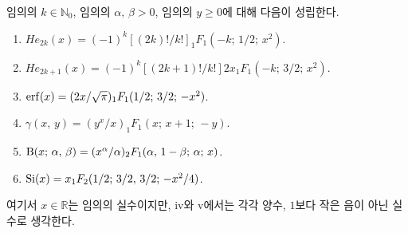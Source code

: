 \begin{theorem}
    임의의 $k\in\mathbb{N}_0$, 임의의 $\alpha,\,\beta>0$, 임의의 $y\geq0$에 대해 다음이 성립한다.
    \begin{enumerate}
        \item $He_{2k}(x)=(-1)^k[(2k)!/k!]_1F_1(-k;\,1/2;\,x^2)$.
        \item $He_{2k+1}(x)=(-1)^k[(2k+1)!/k!]2x_1F_1(-k;\,3/2;\,x^2)$.
        \item $\mathrm{erf}(x)=(2x/\sqrt{\pi})_1F_1(1/2;\,3/2;\,-x^2)$.
        \item $\gamma(x,\,y)=(y^x/x)_1F_1(x;\,x+1;\,-y)$.
        \item $\mathrm{B}(x;\,\alpha,\,\beta)=(x^\alpha/\alpha)_2F_1(\alpha,\,1-\beta;\,\alpha;\,x)$.
        \item $\mathrm{Si}(x)=x_1F_2(1/2;\,3/2,\,3/2;\,-x^2/4)$.
    \end{enumerate}
    여기서 $x\in\mathbb{R}$는 임의의 실수이지만, iv와 v에서는 각각 양수, $1$보다 작은 음이 아닌 실수로 생각한다.
\end{theorem}

